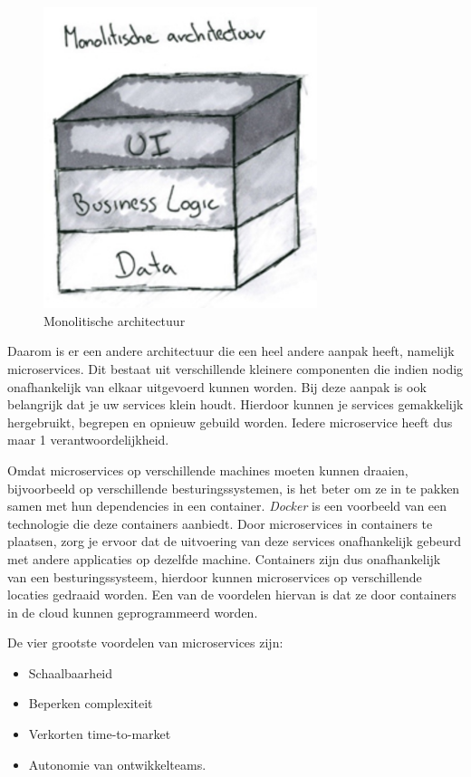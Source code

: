 \begin{figure}[h!]
    \centering
    \includegraphics[width=80mm]{../monolith.png}
    \caption{Monolitische architectuur}
        
\end{figure}

Daarom is er een andere architectuur die een heel andere aanpak heeft, namelijk microservices. Dit bestaat uit verschillende kleinere componenten die indien nodig onafhankelijk van elkaar uitgevoerd kunnen worden. Bij deze aanpak is ook belangrijk dat je uw services klein houdt. Hierdoor kunnen je services gemakkelijk hergebruikt, begrepen en opnieuw gebuild worden. Iedere microservice heeft dus maar 1 verantwoordelijkheid.

Omdat microservices op verschillende machines moeten kunnen draaien, bijvoorbeeld op verschillende besturingssystemen, is het beter om ze in te pakken samen met hun dependencies in een container. \emph{Docker} is een voorbeeld van een technologie die deze containers aanbiedt. Door microservices in containers te plaatsen, zorg je ervoor dat de uitvoering van deze services onafhankelijk gebeurd met andere applicaties op dezelfde machine. Containers zijn dus onafhankelijk van een besturingssysteem, hierdoor kunnen microservices op verschillende locaties gedraaid worden. Een van de voordelen hiervan is dat ze door containers in de cloud kunnen geprogrammeerd worden.

De vier grootste voordelen van microservices zijn: 
\begin{itemize}
    \item Schaalbaarheid
    \item Beperken complexiteit
    \item Verkorten time-to-market
    \item Autonomie van ontwikkelteams.
\end{itemize}



